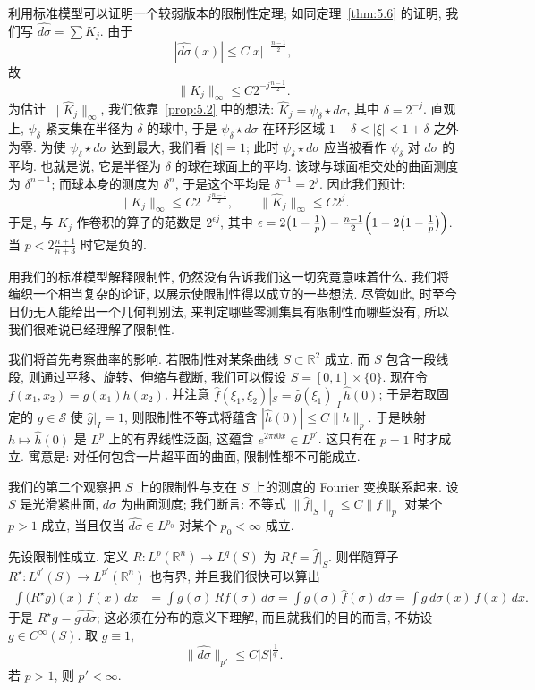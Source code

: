 
利用标准模型可以证明一个较弱版本的限制性定理; 如同定理~\ref{thm:5.6} 的证明, 我们写 $\widehat{d\sigma}=\sum K_j$. 由于
\[
|\widehat{d\sigma}(x)|\leq C|x|^{-\frac{n-1}{2}},
\]
故
\[
\|K_{j}\|_{\infty}\leq C2^{-j\frac{n-1}{2}}.
\]
为估计 $\|\hat{K}_j\|_\infty$, 我们依靠~\ref*{prop:5.2} 中的想法: $\hat{K}_j=\psi_\delta\star d\sigma$, 其中 $\delta=2^{-j}$. 直观上, $\psi_\delta$ 紧支集在半径为 $\delta$ 的球中, 于是 $\psi_\delta\star d\sigma$ 在环形区域 $1-\delta<|\xi|<1+\delta$ 之外为零. 为使 $\psi_\delta\star d\sigma$ 达到最大, 我们看 $|\xi|=1$; 此时 $\psi_\delta\star d\sigma$ 应当被看作 $\psi_\delta$ 对 $d\sigma$ 的平均. 也就是说, 它是半径为 $\delta$ 的球在球面上的平均. 该球与球面相交处的曲面测度为 $\delta^{n-1}$; 而球本身的测度为 $\delta^n$, 于是这个平均是 $\delta^{-1}=2^j$. 因此我们预计:
\[
\|K_{j}\|_{\infty}\leq C2^{-j\frac{n-1}{2}},
\qquad
\|\hat{K}_{j}\|_{\infty}\leq C2^{j}.
\]
于是, 与 $K_j$ 作卷积的算子的范数是 $2^{\epsilon j}$, 其中
$\epsilon=2\bigl(1-\frac{1}{p}\bigr)-\frac{n-1}{2}\Bigl(1-2\bigl(1-\frac{1}{p}\bigr)\Bigr)$.
当 $p<2\frac{n+1}{n+3}$ 时它是负的.

用我们的标准模型解释限制性, 仍然没有告诉我们这一切究竟意味着什么. 我们将编织一个相当复杂的论证, 以展示使限制性得以成立的一些想法. 尽管如此, 时至今日仍无人能给出一个几何判别法, 来判定哪些零测集具有限制性而哪些没有, 所以我们很难说已经理解了限制性.

我们将首先考察曲率的影响. 若限制性对某条曲线 $S\subset\mathbb{R}^2$ 成立, 而 $S$ 包含一段线段, 则通过平移、旋转、伸缩与截断, 我们可以假设 $S=[0,1]\times\{0\}$. 现在令 $f(x_1,x_2)=g(x_1)h(x_2)$, 并注意 $\hat{f}(\xi_1,\xi_2)|_S=\hat{g}(\xi_1)|_I\,\hat{h}(0)$; 于是若取固定的 $g\in\mathcal{S}$ 使 $\hat{g}|_I=1$, 则限制性不等式将蕴含 $|\hat{h}(0)|\leq C\|h\|_{p}$. 于是映射 $h\mapsto\hat{h}(0)$ 是 $L^p$ 上的有界线性泛函, 这蕴含 $e^{2\pi i0x}\in L^{p'}$. 这只有在 $p=1$ 时才成立. 寓意是: 对任何包含一片超平面的曲面, 限制性都不可能成立.

我们的第二个观察把 $S$ 上的限制性与支在 $S$ 上的测度的 Fourier 变换联系起来. 设 $S$ 是光滑紧曲面, $d\sigma$ 为曲面测度; 我们断言: 不等式 $\|\hat{f}|_{S}\|_{q}\leq C\|f\|_{p}$ 对某个 $p>1$ 成立, 当且仅当 $\widehat{d\sigma}\in L^{p_0}$ 对某个 $p_0<\infty$ 成立.

先设限制性成立. 定义 $R:L^p(\mathbb{R}^n)\to L^q(S)$ 为 $Rf=\hat{f}|_S$. 则伴随算子 $R^{\star}:L^{q'}(S)\to L^{p'}(\mathbb{R}^n)$ 也有界, 并且我们很快可以算出
\begin{align*}
\int\bigl(R^{\star}g\bigr)(x)\,f(x)\,dx
&=\int g(\sigma)\,Rf(\sigma)\,d\sigma
=\int g(\sigma)\,\hat{f}(\sigma)\,d\sigma
=\int\widehat{g\,d\sigma}(x)\,f(x)\,dx.
\end{align*}
于是 $R^{\star}g=\widehat{g\,d\sigma}$; 这必须在分布的意义下理解, 而且就我们的目的而言, 不妨设 $g\in C^\infty(S)$. 取 $g\equiv 1$,
\[
\|\widehat{d\sigma}\|_{p'}\leq C|S|^{\frac{1}{q'}}.
\]
若 $p>1$, 则 $p'<\infty$.

